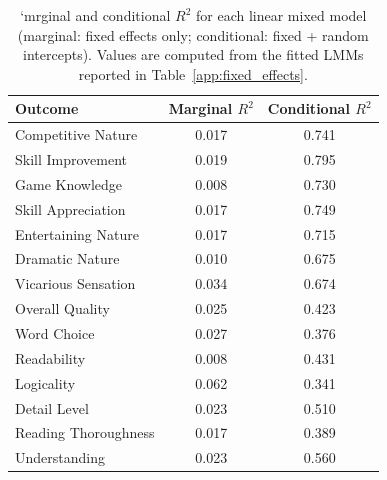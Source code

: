 \begin{table}[H]
  \centering\small
  \begin{tabular}{lcc}
    \toprule
    \textbf{Outcome} & \textbf{Marginal $R^2$} & \textbf{Conditional $R^2$} \\
    \midrule
    Competitive Nature & 0.017 & 0.741 \\
    Skill Improvement & 0.019 & 0.795 \\
    Game Knowledge & 0.008 & 0.730 \\
    Skill Appreciation & 0.017 & 0.749 \\
    Entertaining Nature & 0.017 & 0.715 \\
    Dramatic Nature & 0.010 & 0.675 \\
    Vicarious Sensation & 0.034 & 0.674 \\
    Overall Quality & 0.025 & 0.423 \\
    Word Choice & 0.027 & 0.376 \\
    Readability & 0.008 & 0.431 \\
    Logicality & 0.062 & 0.341 \\
    Detail Level & 0.023 & 0.510 \\
    Reading Thoroughness & 0.017 & 0.389 \\
    Understanding & 0.023 & 0.560 \\
    \bottomrule
  \end{tabular}
  \caption{`mrginal and conditional $R^2$ for each linear mixed model (marginal: fixed effects only; conditional: fixed + random intercepts). Values are computed from the fitted LMMs reported in Table~\ref{app:fixed_effects}.}
  \label{tab:r2_nakagawa}
\end{table}

